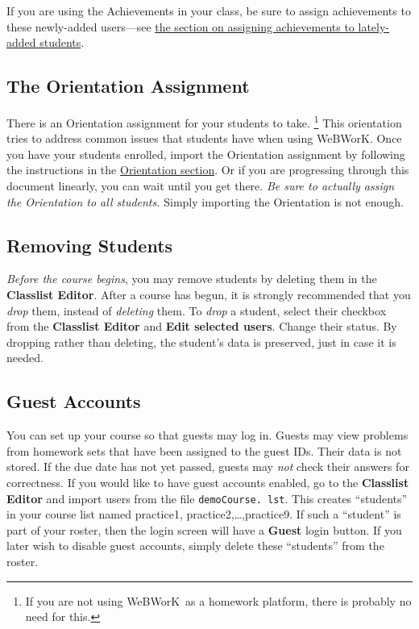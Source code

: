 \documentclass[12pt]{article}
\newcommand{\menu}[1]{\textbf{#1}}
\newcommand{\WW}{WeBWorK}
\begin{document}
If you are using the Achievements in your class, be sure to assign achievements to these newly-added users---see \hyperref[achievementslateaddstudents]{the section on assigning achievements to lately-added students}.

\subsection{The Orientation Assignment}
There is an Orientation assignment for your students to take.
\footnote{If you are not using \WW\ as a homework platform, there is probably no need for this.}
This orientation tries to address common issues that students have when using \WW.
Once you have your students enrolled, import the Orientation assignment by following the instructions in the \hyperref[orientation]{Orientation section}.
Or if you are progressing through this document linearly, you can wait until you get there.
\emph{Be sure to actually assign the Orientation to all students.}
Simply importing the Orientation is not enough.

\subsection{Removing Students}
\emph{Before the course begins}, you may remove students by deleting them in the \menu{Classlist Editor}.
After a course has begun, it is strongly recommended that you \emph{drop} them, instead of \emph{deleting} them.
To \emph{drop} a student, select their checkbox from the \menu{Classlist Editor} and \menu{Edit selected users}.
Change their status.
By dropping rather than deleting, the student's data is preserved, just in case it is needed.

\subsection{Guest Accounts}
You can set up your course so that guests may log in.
Guests may view problems from homework sets that have been assigned to the guest IDs.
Their data is not stored.
If the due date has not yet passed, guests may \emph{not} check their answers for correctness.
If you would like to have guest accounts enabled, go to the \menu{Classlist Editor} and import users from the file \texttt{demoCourse.
	lst}.
This creates ``students'' in your course list named practice1, practice2,\ldots,practice9.
If such a ``student'' is part of your roster, then the login screen will have a \menu{Guest} login button.
If you later wish to disable guest accounts, simply delete these ``students'' from the roster.
\end{document}
